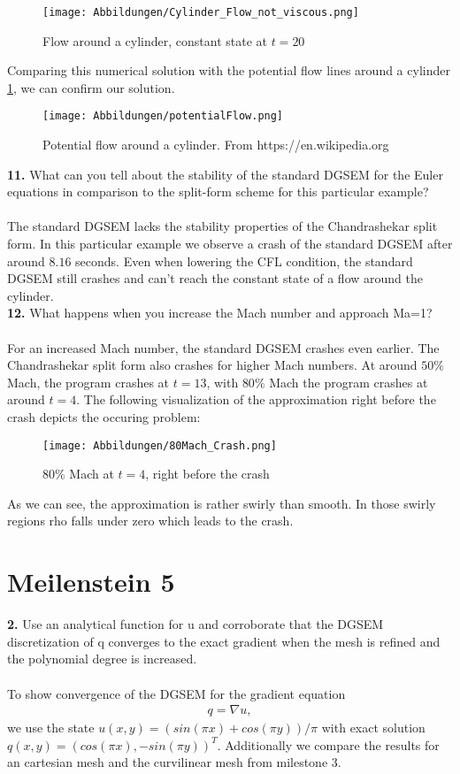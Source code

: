 \documentclass[11pt]{scrartcl}
\begin{document}
\begin{figure}[H]
\texttt{[image: Abbildungen/Cylinder\_Flow\_not\_viscous.png]}
\caption{Flow around a cylinder, constant state at $t = 20 $}
\end{figure} 
Comparing this numerical solution with the potential flow lines around a cylinder \ref{potentialFlow}, we can confirm our solution. \\
\begin{figure}[H]
\centering
\texttt{[image: Abbildungen/potentialFlow.png]}
\label{potentialFlow}
\caption{Potential flow around a cylinder. From https://en.wikipedia.org}
\end{figure}

\textbf{11.} What can you tell about the stability of the standard DGSEM for the Euler equations in comparison to the split-form scheme for this particular example?\\ \ \\
The standard DGSEM lacks the stability properties of the Chandrashekar split form. In this particular example we observe a crash of the standard DGSEM after around $8.16$ seconds. Even when lowering the CFL condition, the standard DGSEM still crashes and can't reach the constant state of a flow around the cylinder.\\
\textbf{12.} What happens when you increase the Mach number and approach Ma=1? \\ \ \\
For an increased Mach number, the standard DGSEM crashes even earlier. The Chandrashekar split form also crashes for higher Mach numbers. At around $50\%$ Mach, the program crashes at $t = 13$, with $80\%$ Mach the program crashes at around $t=4$. The following visualization of the approximation right before the crash depicts the occuring problem: \\
\begin{figure}[H]
\texttt{[image: Abbildungen/80Mach\_Crash.png]}
\caption{80\% Mach at $t=4$, right before the crash}
\end{figure}
As we can see, the approximation is rather swirly than smooth. In those swirly regions rho falls under zero which leads to the crash.


\newpage
\section{Meilenstein 5}

\textbf{2.} Use an analytical function for u and corroborate that the DGSEM
discretization of q converges to the exact gradient when the mesh is
refined and the polynomial degree is increased.\\
\\
To show convergence of the DGSEM for the gradient equation
\begin{align*}
q = \nabla u,
\end{align*}
we use the state $u(x, y)=(sin(\pi x) + cos(\pi y))/\pi$ with exact solution $q(x, y) = (cos(\pi x), -sin(\pi y))^T$. Additionally we compare the results for an cartesian mesh and the curvilinear mesh from milestone $3$.
\end{document}
